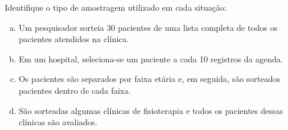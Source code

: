 %
%


\begin{exercicioBanco}[\valorquestao]
Identifique o tipo de amostragem utilizado em cada situação:

\begin{enumerate}[(a)]
    \item Um pesquisador sorteia 30 pacientes de uma lista completa de todos os pacientes atendidos na clínica.
    \item Em um hospital, seleciona-se um paciente a cada 10 registros da agenda.
    \item Os pacientes são separados por faixa etária e, em seguida, são sorteados pacientes dentro de cada faixa.
    \item São sorteadas algumas clínicas de fisioterapia e todos os pacientes dessas clínicas são avaliados.
\end{enumerate}
\end{exercicioBanco}
